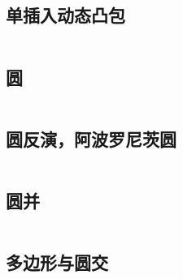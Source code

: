 \documentclass[titlepage, a4paper]{article}
\begin{document}
\begin{multicols}{2}
\begin{spacing}{0.6}
				\subsection{单插入动态凸包}
				\inputminted{cpp}{src/Geometry/dynamic_convex_hull.cpp}
				
				
				\subsection{圆}
					\inputminted[highlightlines={7}]{cpp}{src/Geometry/circle.cpp}
				\subsection{圆反演，阿波罗尼茨圆}
				\begin{small}
					
				\end{small}
					\inputminted{cpp}{src/yzh/circle_inversion.cpp}
				\subsection{圆并}
					\inputminted{cpp}{src/Geometry/圆并.cpp}
				\subsection{多边形与圆交}
					\inputminted{cpp}{src/Geometry/多边形和圆的交.cpp}
				

\end{spacing}
\end{multicols}
\end{document}
